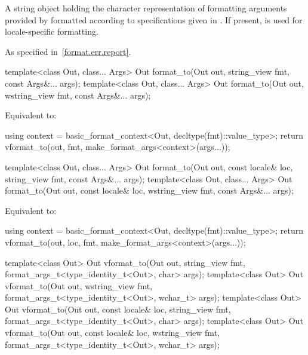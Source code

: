 \begin{itemdescr}
\pnum
\returns
A string object holding the character representation of
formatting arguments provided by  formatted according to
specifications given in .
If present,  is used for locale-specific formatting.

\pnum
\throws
As specified in~\ref{format.err.report}.
\end{itemdescr}

%
\begin{itemdecl}
template<class Out, class... Args>
  Out format_to(Out out, string_view fmt, const Args&... args);
template<class Out, class... Args>
  Out format_to(Out out, wstring_view fmt, const Args&... args);
\end{itemdecl}

\begin{itemdescr}
\pnum
\effects
Equivalent to:
\begin{codeblock}
using context = basic_format_context<Out, decltype(fmt)::value_type>;
return vformat_to(out, fmt, make_format_args<context>(args...));
\end{codeblock}
\end{itemdescr}

%
\begin{itemdecl}
template<class Out, class... Args>
  Out format_to(Out out, const locale& loc, string_view fmt, const Args&... args);
template<class Out, class... Args>
  Out format_to(Out out, const locale& loc, wstring_view fmt, const Args&... args);
\end{itemdecl}

\begin{itemdescr}
\pnum
\effects
Equivalent to:
\begin{codeblock}
using context = basic_format_context<Out, decltype(fmt)::value_type>;
return vformat_to(out, loc, fmt, make_format_args<context>(args...));
\end{codeblock}
\end{itemdescr}

%
\begin{itemdecl}
template<class Out>
  Out vformat_to(Out out, string_view fmt,
                 format_args_t<type_identity_t<Out>, char> args);
template<class Out>
  Out vformat_to(Out out, wstring_view fmt,
                 format_args_t<type_identity_t<Out>, wchar_t> args);
template<class Out>
  Out vformat_to(Out out, const locale& loc, string_view fmt,
                 format_args_t<type_identity_t<Out>, char> args);
template<class Out>
  Out vformat_to(Out out, const locale& loc, wstring_view fmt,
                 format_args_t<type_identity_t<Out>, wchar_t> args);
\end{itemdecl}

